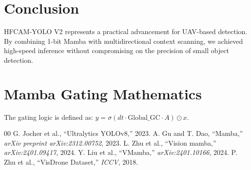 \documentclass[10pt,conference]{IEEEtran}
\begin{document}
\section{Conclusion}
HFCAM-YOLO V2 represents a practical advancement for UAV-based detection. By combining 1-bit Mamba with multidirectional context scanning, we achieved high-speed inference without compromising on the precision of small object detection.

\appendices
\section{Mamba Gating Mathematics}
The gating logic is defined as: $y = \sigma(dt \cdot \text{Global\_GC} \cdot A) \odot x$.

\begin{thebibliography}{00}
 G. Jocher et al., ``Ultralytics YOLOv8,'' 2023.
 A. Gu and T. Dao, ``Mamba,'' \emph{arXiv preprint arXiv:2312.00752}, 2023.
 L. Zhu et al., ``Vision mamba,'' \emph{arXiv:2401.09417}, 2024.
 Y. Liu et al., ``VMamba,'' \emph{arXiv:2401.10166}, 2024.
 P. Zhu et al., ``VisDrone Dataset,'' \emph{ICCV}, 2018.
\end{thebibliography}
\end{document}
